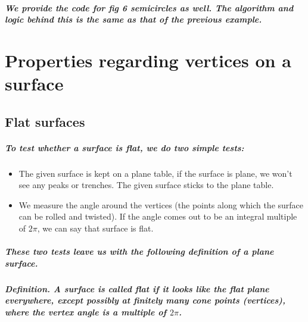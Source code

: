\documentclass{report}
\begin{document}

\paragraph{We provide the code for fig 6 semicircles as well. The algorithm and logic behind this is the same as that of the previous example.}



\appendix

\chapter{Properties regarding vertices on a surface}

\section{Flat surfaces}

\paragraph{To test whether a surface is flat, we do two simple tests:}

\begin{itemize}
\item  {The given surface is kept on a plane table, if the surface is plane, we won’t see any peaks or trenches. The given surface sticks to the plane table.}

\item  { We measure the angle around the vertices (the points along which the surface can be rolled and twisted). If the angle comes out to be an integral multiple of $2\pi$, we can say that surface is flat.}
\end{itemize}

\paragraph{These two tests leave us with the following definition of a plane surface.}



\paragraph{\textbf{Definition.} A surface is called flat if it looks like the flat plane everywhere, except possibly at finitely many cone points (vertices), where the vertex angle is a multiple of $2\pi$.}
\end{document}
